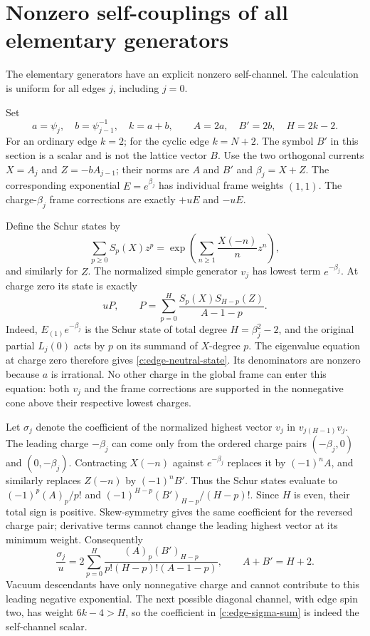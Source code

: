 \documentclass[11pt,a4paper]{article}
\numberwithin{equation}{section}
\theoremstyle{definition}\newtheorem{definition}[theorem]{Definition}
\theoremstyle{remark}\newtheorem{remark}[theorem]{Remark}
\begin{document}
\section{Nonzero self-couplings of all elementary generators}

The elementary generators have an explicit nonzero self-channel. The calculation is uniform for all edges $j$, including $j=0$.

Set
\[
 a=\psi_j,\quad b=\psi_{j-1}^{-1},\quad k=a+b,
 \qquad A=2a,\quad B'=2b,\quad H=2k-2.
\]
For an ordinary edge $k=2$; for the cyclic edge $k=N+2$.  The symbol
$B'$ in this section is a scalar and is not the lattice vector $B$.
Use the two orthogonal currents $X=A_j$ and $Z=-bA_{j-1}$; their
norms are $A$ and $B'$ and $\beta_j=X+Z$.  The corresponding
exponential $E=e^{\beta_j}$ has individual frame weights $(1,1)$.
The charge-$\beta_j$ frame corrections are exactly $+uE$ and $-uE$.

Define the Schur states by
\[
 \sum_{p\geq0}S_p(X)z^p
 =\exp\left(\sum_{n\geq1}\frac{X(-n)}n z^n\right),
\]
and similarly for $Z$.  The normalized simple generator $v_j$ has
lowest term $e^{-\beta_j}$.  At charge zero its state is exactly
\begin{equation}\label{c:edge-neutral-state}
 uP,\qquad
 P=\sum_{p=0}^H\frac{S_p(X)S_{H-p}(Z)}{A-1-p}.
\end{equation}
Indeed, $E_{(1)}e^{-\beta_j}$ is the Schur state of total degree
$H=\beta_j^2-2$, and the original partial $L_j(0)$ acts by $p$ on
its summand of $X$-degree $p$.  The eigenvalue equation at charge
zero therefore gives \eqref{c:edge-neutral-state}.  Its denominators
are nonzero because $a$ is irrational.  No other charge in the
global frame can enter this equation: both $v_j$ and the frame
corrections are supported in the nonnegative cone above their
respective lowest charges.

Let $\sigma_j$ denote the coefficient of the normalized highest
vector $v_j$ in $v_{j(H-1)}v_j$.  The leading charge $-\beta_j$
can come only from the ordered charge pairs $(-\beta_j,0)$ and
$(0,-\beta_j)$.  Contracting $X(-n)$ against $e^{-\beta_j}$ replaces
it by $(-1)^n A$, and similarly replaces $Z(-n)$ by $(-1)^nB'$.
Thus the Schur states evaluate to
$(-1)^p(A)_p/p!$ and $(-1)^{H-p}(B')_{H-p}/(H-p)!$.
Since $H$ is even, their total sign is positive.  Skew-symmetry gives
the same coefficient for the reversed charge pair; derivative terms
cannot change the leading highest vector at its minimum weight.
Consequently
\begin{equation}\label{c:edge-sigma-sum}
 \frac{\sigma_j}{u}
 =2\sum_{p=0}^H
 \frac{(A)_p(B')_{H-p}}{p!(H-p)!(A-1-p)},
 \qquad A+B'=H+2.
\end{equation}
Vacuum descendants have only nonnegative charge and cannot contribute
to this leading negative exponential.  The next possible diagonal
channel, with edge spin two, has weight $6k-4>H$, so the coefficient
in \eqref{c:edge-sigma-sum} is indeed the self-channel scalar.
\end{document}
